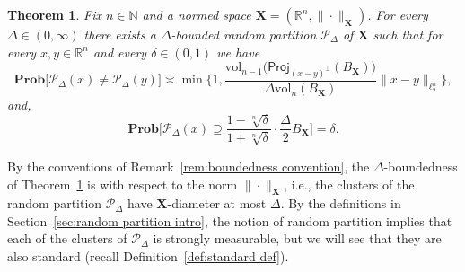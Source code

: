 \documentclass[11pt,reqno]{amsart}
\renewcommand{\d}{\delta}
\newcommand{\proj}{\mathsf{Proj}}
\newcommand{\X}{\mathbf X}
\newcommand{\R}{\mathbb R}
\newtheorem{theorem}{Theorem}
\theoremstyle{remark}
\renewcommand{\supset}{\supseteq}
\newcommand{\N}{\mathbb N}
\renewcommand{\Pr}{\mathbf{Prob}}
\newcommand{\vol}{\mathrm{vol}}
\renewcommand{\1}{\mathbf 1}
\newcommand{\Part}{\mathscr{P}}
\newcommand{\pad}{\mathsf{PAD}}
\begin{document}
\begin{theorem}\label{thm:sep and pad at once} Fix $n\in \N$ and a normed space $\X=(\R^n,\|\cdot\|_{\X})$. For every $\Delta\in (0,\infty)$ there exists a  $\Delta$-bounded random partition $\Part_{\!\Delta}$ of $\X$ such that for every $x,y\in \R^n$ and every $\d\in (0,1)$ we have
\begin{equation}\label{eq:part Delta in theorem}
\Pr\big[\Part_{\!\Delta}(x)\neq \Part_{\!\Delta}(y)\big]\asymp \min\bigg\{1, \frac{\vol_{n-1}\big(\proj_{(x-y)^\perp}(B_{\X})\big)}{\Delta\vol_n(B_{\X})}\|x-y\|_{\ell_2^n}\bigg\},
\end{equation}
and,
\begin{equation*}
 \Pr\bigg[\Part_{\!\Delta}(x)\supset \frac{1-\sqrt[n]{\d}}{1+\sqrt[n]{\d}}\cdot\frac{\Delta}{2} B_{\X}\bigg]= \d.
\end{equation*}
\end{theorem}



 By the conventions of Remark~\ref{rem:boundedness convention}, the $\Delta$-boundedness of Theorem~\ref{thm:sep and pad at once} is with respect to the norm $\|\cdot\|_{\X}$, i.e., the clusters of the random partition $\Part_{\!\Delta}$ have $\X$-diameter at most $\Delta$. By the definitions in Section~\ref{sec:random partition intro}, the notion of random partition implies that each of the clusters of $\Part_{\!\Delta}$  is strongly measurable, but we will see that they are also standard (recall Definition~\ref{def:standard def}).

\end{document}
